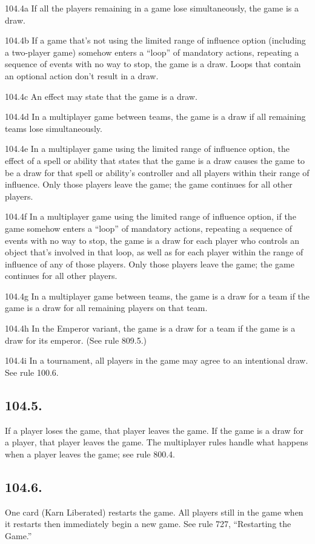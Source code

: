 104.4a If all the players remaining in a game lose simultaneously, the game is a draw.

104.4b If a game that’s not using the limited range of influence option (including a two-player game) somehow enters a “loop” of mandatory actions, repeating a sequence of events with no way to stop, the game is a draw. Loops that contain an optional action don’t result in a draw.

104.4c An effect may state that the game is a draw.

104.4d In a multiplayer game between teams, the game is a draw if all remaining teams lose simultaneously.

104.4e In a multiplayer game using the limited range of influence option, the effect of a spell or ability that states that the game is a draw causes the game to be a draw for that spell or ability’s controller and all players within their range of influence. Only those players leave the game; the game continues for all other players.

104.4f In a multiplayer game using the limited range of influence option, if the game somehow enters a “loop” of mandatory actions, repeating a sequence of events with no way to stop, the game is a draw for each player who controls an object that’s involved in that loop, as well as for each player within the range of influence of any of those players. Only those players leave the game; the game continues for all other players.

104.4g In a multiplayer game between teams, the game is a draw for a team if the game is a draw for all remaining players on that team.

104.4h In the Emperor variant, the game is a draw for a team if the game is a draw for its emperor. (See rule 809.5.)

104.4i In a tournament, all players in the game may agree to an intentional draw. See rule 100.6.

\subsection*{104.5.}
If a player loses the game, that player leaves the game. If the game is a draw for a player, that player leaves the game. The multiplayer rules handle what happens when a player leaves the game; see rule 800.4.

\subsection*{104.6.}
One card (Karn Liberated) restarts the game. All players still in the game when it restarts then immediately begin a new game. See rule 727, “Restarting the Game.”

